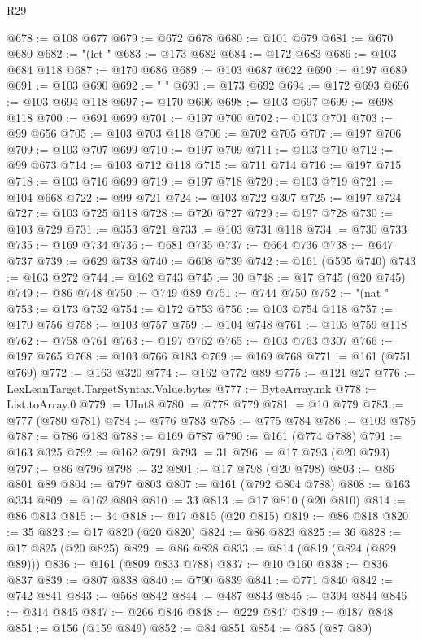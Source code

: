 \begin{lexlean}{R29}
\begin{coremodule}
@678 := @108 @677
@679 := @672 @678
@680 := @101 @679
@681 := @670 @680
@682 := "(let "
@683 := @173 @682
@684 := @172 @683
@686 := @103 @684 @118
@687 := @170 @686
@689 := @103 @687 @622
@690 := @197 @689
@691 := @103 @690
@692 := " "
@693 := @173 @692
@694 := @172 @693
@696 := @103 @694 @118
@697 := @170 @696
@698 := @103 @697
@699 := @698 @118
@700 := @691 @699
@701 := @197 @700
@702 := @103 @701
@703 := @99 @656
@705 := @103 @703 @118
@706 := @702 @705
@707 := @197 @706
@709 := @103 @707 @699
@710 := @197 @709
@711 := @103 @710
@712 := @99 @673
@714 := @103 @712 @118
@715 := @711 @714
@716 := @197 @715
@718 := @103 @716 @699
@719 := @197 @718
@720 := @103 @719
@721 := @104 @668
@722 := @99 @721
@724 := @103 @722 @307
@725 := @197 @724
@727 := @103 @725 @118
@728 := @720 @727
@729 := @197 @728
@730 := @103 @729
@731 := @353 @721
@733 := @103 @731 @118
@734 := @730 @733
@735 := @169 @734
@736 := @681 @735
@737 := @664 @736
@738 := @647 @737
@739 := @629 @738
@740 := @608 @739
@742 := @161 (@595 @740)
@743 := @163 @272
@744 := @162 @743
@745 := 30
@748 := @17 @745 (@20 @745)
@749 := @86 @748
@750 := @749 @89
@751 := @744 @750
@752 := "(nat "
@753 := @173 @752
@754 := @172 @753
@756 := @103 @754 @118
@757 := @170 @756
@758 := @103 @757
@759 := @104 @748
@761 := @103 @759 @118
@762 := @758 @761
@763 := @197 @762
@765 := @103 @763 @307
@766 := @197 @765
@768 := @103 @766 @183
@769 := @169 @768
@771 := @161 (@751 @769)
@772 := @163 @320
@774 := @162 @772 @89
@775 := @121 @27
@776 := LexLeanTarget.TargetSyntax.Value.bytes
@777 := ByteArray.mk
@778 := List.toArray.{0}
@779 := UInt8
@780 := @778 @779
@781 := @10 @779
@783 := @777 (@780 @781)
@784 := @776 @783
@785 := @775 @784
@786 := @103 @785
@787 := @786 @183
@788 := @169 @787
@790 := @161 (@774 @788)
@791 := @163 @325
@792 := @162 @791
@793 := 31
@796 := @17 @793 (@20 @793)
@797 := @86 @796
@798 := 32
@801 := @17 @798 (@20 @798)
@803 := @86 @801 @89
@804 := @797 @803
@807 := @161 (@792 @804 @788)
@808 := @163 @334
@809 := @162 @808
@810 := 33
@813 := @17 @810 (@20 @810)
@814 := @86 @813
@815 := 34
@818 := @17 @815 (@20 @815)
@819 := @86 @818
@820 := 35
@823 := @17 @820 (@20 @820)
@824 := @86 @823
@825 := 36
@828 := @17 @825 (@20 @825)
@829 := @86 @828
@833 := @814 (@819 (@824 (@829 @89)))
@836 := @161 (@809 @833 @788)
@837 := @10 @160
@838 := @836 @837
@839 := @807 @838
@840 := @790 @839
@841 := @771 @840
@842 := @742 @841
@843 := @568 @842
@844 := @487 @843
@845 := @394 @844
@846 := @314 @845
@847 := @266 @846
@848 := @229 @847
@849 := @187 @848
@851 := @156 (@159 @849)
@852 := @84 @851
@854 := @85 (@87 @89)

\end{coremodule}
\end{lexlean}
